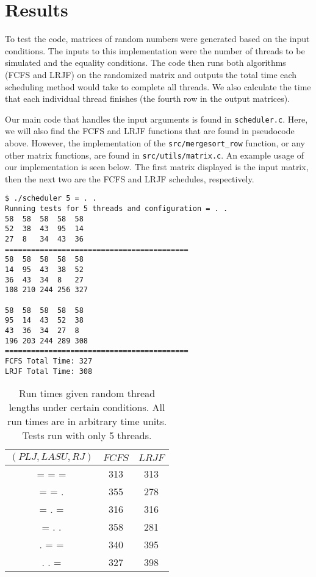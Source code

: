 \documentclass[letterpaper,12pt]{article}
\begin{document}
\section{Results}
To test the code, matrices of random numbers were generated based on the input conditions.
The inputs to this implementation were the number of threads to be simulated and the equality conditions.
The code then runs both algorithms (FCFS and LRJF) on the randomized matrix and outputs the total time each scheduling method would take to complete all threads. 
We also calculate the time that each individual thread finishes (the fourth row in the output matrices). 

Our main code that handles the input arguments is found in \texttt{scheduler.c}.
Here, we will also find the FCFS and LRJF functions that are found in pseudocode above.
However, the implementation of the \texttt{src/mergesort\_row} function, or any other matrix functions, are found in \texttt{src/utils/matrix.c}.
An example usage of our implementation is seen below. 
The first matrix displayed is the input matrix, then the next two are the FCFS and LRJF schedules, respectively.

\begin{verbatim}
$ ./scheduler 5 = . .
Running tests for 5 threads and configuration = . .
58	58	58	58	58	
52	38	43	95	14	
27	8	34	43	36	
==========================================
58	58	58	58	58	
14	95	43	38	52	
36	43	34	8	27	
108	210	244	256	327	

58	58	58	58	58	
95	14	43	52	38	
43	36	34	27	8	
196	203	244	289	308
==========================================
FCFS Total Time: 327
LRJF Total Time: 308
\end{verbatim}

\begin{table}[ht]
\begin{center}
\caption{Run times given random thread lengths under certain conditions. All run times are in arbitrary time units. Tests run with only 5 threads.}
\begin{tabular}{|c|cc|} 
\hline
\multicolumn{1}{|c|}{$(PLJ, LASU, RJ)$} &
\multicolumn{1}{c}{$FCFS$} &
\multicolumn{1}{c|}{$LRJF$} \\
\hline
= = = & 313 & 313 \\
= = .  & 355 & 278 \\
= . = & 316 & 316 \\
= . . & 358 & 281 \\
. = = & 340 & 395 \\
. . = & 327 & 398 \\
\hline
\end{tabular}
\end{center}
\end{table}
\end{document}
